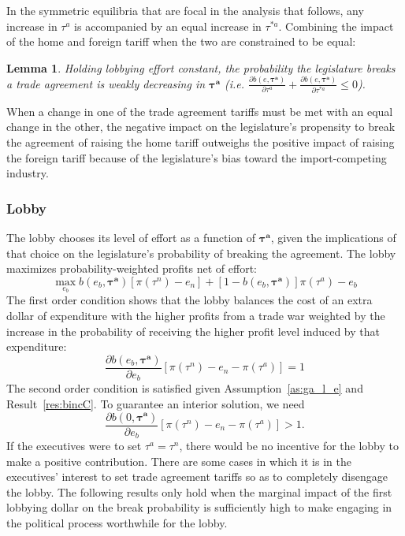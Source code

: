 \documentclass[10pt]{article}
\newtheorem{lemma}{Lemma}
\newcommand{\bta}{\bm{\tau^a}}
\begin{document}
In the symmetric equilibria that are focal in the analysis that follows, any increase in $\tau^a$ is accompanied by an equal increase in $\tau^{*a}$. Combining the impact of the home and foreign tariff when the two are constrained to be equal:
\begin{lemma}
	Holding lobbying effort constant, the probability the legislature breaks a trade agreement is weakly decreasing in $\bta$ (i.e. $\frac{\partial b(e,\bta)}{\partial  \tau^a} + \frac{\partial b(e,\bta)}{\partial  \tau^{*a}} \leq 0$).
	\label{res:bcomb}
\end{lemma}

\noindent When a change in one of the trade agreement tariffs must be met with an equal change in the other, the negative impact on the legislature's propensity to break the agreement of raising the home tariff outweighs the positive impact of raising the foreign tariff because of the legislature's bias toward the import-competing industry.

\subsubsection{Lobby}
\label{sec:lob_un}
The lobby chooses its level of effort as a function of $\bta$, given the implications of that choice on the legislature's probability of breaking the agreement. The lobby maximizes probability-weighted profits net of effort:
\[
  \max_{e_b} b(e_b,\bta) \left[\pi(\tau^n) - e_n \right] + [1 - b(e_b,\bta)] \pi(\tau^a) - e_b
\]
The first order condition shows that the lobby balances the cost of an extra dollar of expenditure with the higher profits from a trade war weighted by the increase in the probability of receiving the higher profit level induced by that expenditure:
\begin{equation}
	\frac{\partial b(e_b,\bta)}{\partial e_b} \left[ \pi(\tau^n) -e_n - \pi(\tau^a) \right] = 1 
	\label{eq:lobbyfoc}
\end{equation}
The second order condition is satisfied given Assumption~\ref{as:ga_l_e} and Result~\ref{res:bincC}. To guarantee an interior solution, we need
  \begin{equation}
	  \frac{\partial b(0,\bta)}{\partial e_b} \left[ \pi(\tau^n) -e_n- \pi(\tau^a) \right] > 1.
		\label{ine:lobint}	
  \end{equation}
If the executives were to set $\tau^a = \tau^n$, there would be no incentive for the lobby to make a positive contribution. There are some cases in which it is in the executives' interest to set trade agreement tariffs so as to completely disengage the lobby. The following results only hold when the marginal impact of the first lobbying dollar on the break probability is sufficiently high to make engaging in the political process worthwhile for the lobby.
  
\end{document}
